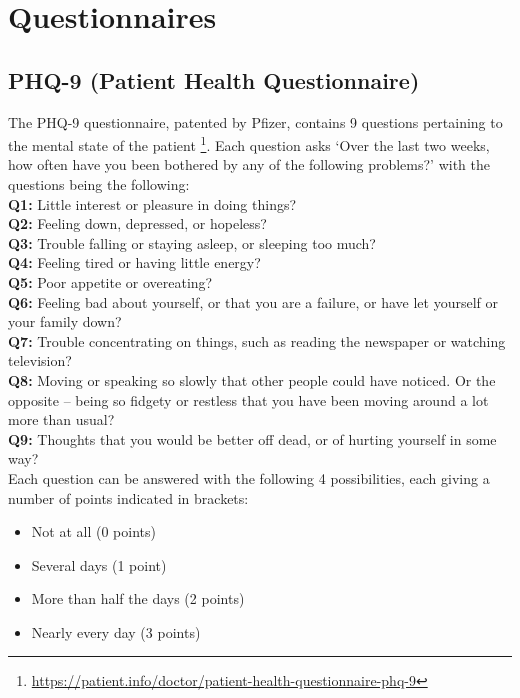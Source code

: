 \chapter{Questionnaires}
\label{appendix:questionnaires}
\section{PHQ-9 (Patient Health Questionnaire)}
The PHQ-9 questionnaire, patented by Pfizer, contains 9 questions pertaining to the mental state of the patient \footnote{\url{https://patient.info/doctor/patient-health-questionnaire-phq-9}}. Each question asks ‘Over the last two weeks, how often have you been bothered by any of the following problems?’ with the questions being the following: \\

\textbf{Q1:} Little interest or pleasure in doing things? \\

\textbf{Q2:} Feeling down, depressed, or hopeless? \\

\textbf{Q3:} Trouble falling or staying asleep, or sleeping too much? \\

\textbf{Q4:} Feeling tired or having little energy? \\

\textbf{Q5:} Poor appetite or overeating? \\

\textbf{Q6:} Feeling bad about yourself, or that you are a failure, or have let yourself or your family down? \\

\textbf{Q7:} Trouble concentrating on things, such as reading the newspaper or watching television? \\

\textbf{Q8:} Moving or speaking so slowly that other people could have noticed. Or the opposite – being so fidgety or restless that you have been moving around a lot more than usual? \\

\textbf{Q9:} Thoughts that you would be better off dead, or of hurting yourself in some way? \\

Each question can be answered with the following 4 possibilities, each giving a number of points indicated in brackets:

\begin{itemize}
\item Not at all (0 points)
\item Several days (1 point)
\item More than half the days (2 points)
\item Nearly every day (3 points)
\end{itemize}

